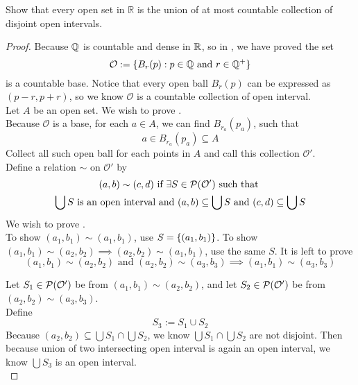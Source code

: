 \documentclass{report}
\begin{document}
\begin{question}{}{}
Show that every open set in \( \mathbb{R} \) is the union of at most countable collection of disjoint open intervals.
\end{question}
\begin{proof}
Because $\mathbb{Q}$ is countable and dense in  $\mathbb{R}$, so in , we have proved the set
\begin{equation}
\mathcal{O}:=\{ B_r(p):p\in\mathbb{Q}\text{ and }r\in\mathbb{Q}^+ \}
\end{equation}
is a countable base. Notice that every open ball $B_r(p)$ can be expressed as $(p-r,p+r)$, so we know $\mathcal{O}$ is a countable collection of open interval.\\

Let $A$ be an open set. We wish to prove .\\


Because $\mathcal{O}$ is a base, for each $a\in A$, we can find $B_{r_a}(p_a)$, such that
\begin{equation}
a\in B_{r_a}(p_a)\subseteq A
\end{equation}
Collect all such open ball for each points in $A$ and call this collection  $\mathcal{O}'$.\\

Define a relation $\sim$ on $\mathcal{O}'$ by 
\begin{gather}
  (a,b)\sim (c,d) \text{ if }\exists S\in \mathcal{P}(\mathcal{O}')\text{ such that }\\
  \bigcup S\text{ is an open interval and }(a,b)\subseteq\bigcup S\text{ and }(c,d)\subseteq \bigcup S
\end{gather}
We wish to prove .\\

To show $(a_1,b_1)\sim (a_1,b_1)$, use $S=\{ (a_1,b_1) \}$. To show $(a_1,b_1)\sim (a_2,b_2)\implies (a_2,b_2)\sim (a_1,b_1)$, use the same $S$. It is left to prove
\begin{equation}
  (a_1,b_1)\sim (a_2,b_2)\text{ and }(a_2,b_2)\sim (a_3,b_3)\implies (a_1,b_1)\sim (a_3,b_3)
\end{equation}

Let $S_1\in \mathcal{P}(\mathcal{O}')$ be from $(a_1,b_1)\sim (a_2,b_2)$, and let $S_2\in \mathcal{P}(\mathcal{O}')$ be from $(a_2,b_2)\sim (a_3,b_3)$.\\

Define 
\begin{equation}
S_3:=S_1\cup S_2 
\end{equation}
Because $(a_2,b_2)\subseteq \bigcup S_1\cap \bigcup S_2$, we know $\bigcup S_1\cap \bigcup S_2$ are not disjoint. Then because union of two intersecting open interval is again an open interval, we know $\bigcup S_3$ is an open interval.\\


\end{proof}
\end{document}
